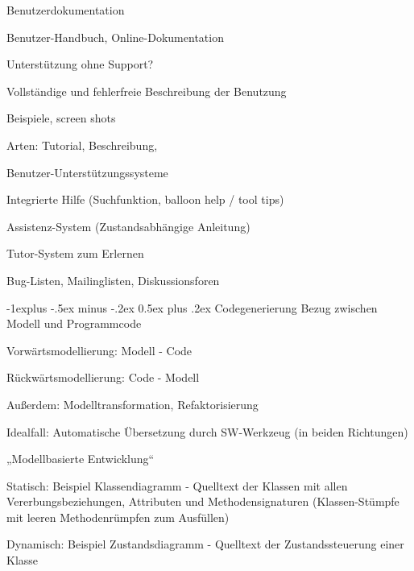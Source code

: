\documentclass[a4paper]{article}
\makeatletter
\renewcommand{\subsection}{\@startsection{subsection}{2}{0mm}%
                                {-1explus -.5ex minus -.2ex}%
                                {0.5ex plus .2ex}%
                                {\normalfont\normalsize\bfseries}}
\makeatother
\begin{document}
\begin{multicols}{3}
  Benutzerdokumentation
  \begin{itemize*}
    \item Benutzer-Handbuch, Online-Dokumentation
    \item Unterstützung ohne Support?
    \item Vollständige und fehlerfreie Beschreibung der Benutzung
    \begin{itemize*}
      \item Beispiele, screen shots
    \end{itemize*}
    \item Arten: Tutorial, Beschreibung,
  \end{itemize*}

  Benutzer-Unterstützungssysteme
  \begin{itemize*}
    \item Integrierte Hilfe (Suchfunktion, balloon help / tool tips)
    \item Assistenz-System (Zustandsabhängige Anleitung)
    \item Tutor-System zum Erlernen
    \item Bug-Listen, Mailinglisten, Diskussionsforen
  \end{itemize*}

  \subsection{Codegenerierung}
  Bezug zwischen Modell und Programmcode
  \begin{itemize*}
    \item Vorwärtsmodellierung: Modell - Code
    \item Rückwärtsmodellierung: Code - Modell
    \begin{itemize*}
      \item Außerdem: Modelltransformation, Refaktorisierung
    \end{itemize*}
    \item Idealfall: Automatische Übersetzung durch SW-Werkzeug (in beiden Richtungen)
    \begin{itemize*}
      \item „Modellbasierte Entwicklung“
    \end{itemize*}
    \item Statisch: Beispiel Klassendiagramm - Quelltext der Klassen mit allen Vererbungsbeziehungen, Attributen und Methodensignaturen (Klassen-Stümpfe mit leeren Methodenrümpfen zum Ausfüllen)
    \item Dynamisch: Beispiel Zustandsdiagramm - Quelltext der Zustandssteuerung einer Klasse
  \end{itemize*}


\end{multicols}
\end{document}
